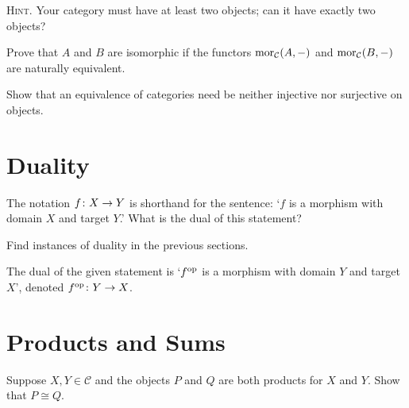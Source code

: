 {\scshape Hint}. Your category must have at least two objects; can it have exactly two objects?
\item Prove that $A$ and $B$ are isomorphic if the functors $\operatorname{mor}_{\mathcal{C}}(A,-)$ and $\operatorname{mor}_{\mathcal{C}}(B,-)$ are naturally equivalent.
\een
\ep

\bs
\ben[label=(\alph*)]
\item
\item
\item
\een
\es

\bx
Show that an equivalence of categories need be neither injective nor surjective on objects.
\ex

\bs
\es

\section{Duality}

\bx
\ben[label=(\alph*)]
\item The notation $f \colon X \to Y$ is shorthand for the sentence: `$f$ is a morphism with domain $X$ and target $Y$.' What is the dual of this statement?
\item Find instances of duality in the previous sections.
\een
\ex

\bs
\ben[label=(\alph*)]
\item The dual of the given statement is `$f^{\mathrm{op}}$ is a morphism with domain $Y$ and target $X$', denoted $f^{\mathrm{op}}\colon Y\to X$.
\item
\een
\es

\section{Products and Sums}

\bp
Suppose $X,Y\in \mathcal{C}$ and the objects $P$ and $Q$ are both products for $X$ and $Y$. Show that $P\cong Q$.
\ep

